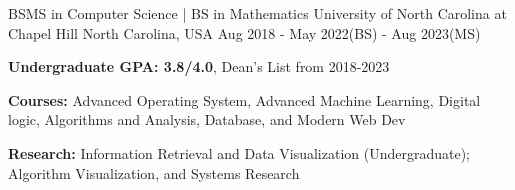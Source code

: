 

\begin{cventries}
\cventry
    {BSMS in Computer Science | BS in Mathematics} %
    {University of North Carolina at Chapel Hill} %
    {North Carolina, USA} %
    {Aug 2018 - May 2022(BS) - Aug 2023(MS)} %
    {
      \begin{cvitems} %
        \item {\textbf{Undergraduate GPA: 3.8/4.0}, Dean's List from 2018-2023}
        \item {\textbf{Courses:} Advanced Operating System, Advanced Machine Learning, Digital logic, Algorithms and Analysis, Database, and Modern Web Dev}
        \item {\textbf{Research:}  Information Retrieval and Data Visualization (Undergraduate); Algorithm Visualization, and Systems Research}
      \end{cvitems}
    }

\end{cventries}
